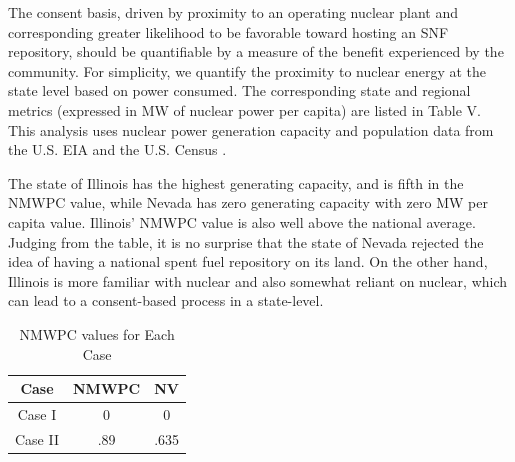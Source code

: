 The consent basis, driven by proximity to an operating nuclear plant and 
corresponding greater likelihood to be favorable toward hosting an \gls{SNF} 
repository, should be quantifiable by a measure of the benefit experienced by 
the community.  For simplicity, we quantify the proximity to nuclear energy at 
the state level  based on power consumed. The corresponding state and regional 
metrics (expressed in MW of nuclear power per capita) are listed in Table V. This 
analysis uses nuclear power generation capacity and population data from the 
U.S. \gls{EIA} \cite{eia_state_2012} and the U.S. Census \cite{census}.  

\begin{table}[h]
	
	\centering
	\caption {\gls{NMWPC} values for different states}

	\end{table}
	
	
The state of Illinois has the highest generating capacity, and is fifth in the \gls{NMWPC}
 value, while Nevada has zero generating capacity with zero MW per capita value. 
Illinois' \gls{NMWPC} value is also well above the national average. Judging from the
table, it is no surprise that the state of Nevada rejected the idea of having a national
spent fuel repository on its land. On the other hand, Illinois is more familiar with 
nuclear and also somewhat reliant on nuclear, which can lead to a consent-based process
in a state-level. 

\begin{table}[h]
	
	\centering
	\caption {\gls{NMWPC} values for Each Case}

		\begin{tabular}{|c|c|c|}
			\hline
			Case & NMWPC & NV \\
			\hline
			Case I & 0 & 0\\
			Case II & .89 & .635\\
					\hline
                \end{tabular}
\end{table}


